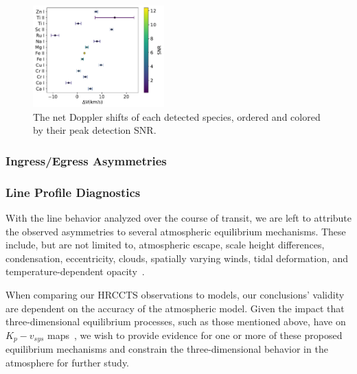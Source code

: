 \documentclass[twocolumn]{aastex631}
\begin{document}
        
        \begin{figure}[]\label{fig:combined-species-snr} 
            \includegraphics[width=0.45\textwidth]{plots-updated/KELT-20b.inverted-transmission-better.CombinedRVs.pdf}
            \caption{The net Doppler shifts of each detected species, ordered and colored by their peak detection SNR.}
            
        \end{figure}

        
            \subsubsection{Ingress/Egress Asymmetries}\label{subsubsec:Ingress/Egress Asymmetries}

                
            \subsubsection{Line Profile Diagnostics}\label{subsubsec:Wind Profile Diagnostics}
                With the line behavior analyzed over the course of transit, we are left to attribute the observed asymmetries to several atmospheric equilibrium mechanisms. These include, but are not limited to, atmospheric escape, scale height differences, condensation, eccentricity, clouds, spatially varying winds, tidal deformation, and temperature-dependent opacity~\citep{Savel2023}. 

                When comparing our HRCCTS observations to models, our conclusions' validity are dependent on the accuracy of the atmospheric model. Given the impact that three-dimensional equilibrium processes, such as those mentioned above, have on $K_p-v_{sys}$ maps~\citep{Wardenier2021}, we wish to provide evidence for one or more of these proposed equilibrium mechanisms and constrain the three-dimensional behavior in the atmosphere for further study.
\end{document}
